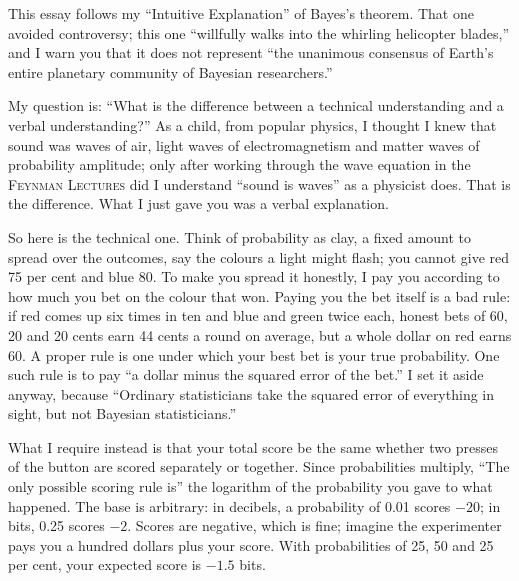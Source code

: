
This essay follows my ``Intuitive Explanation'' of Bayes's theorem. That one avoided controversy; this one ``willfully walks into the whirling helicopter blades,'' and I warn you that it does not represent ``the unanimous consensus of Earth's entire planetary community of Bayesian researchers.'' 

My question is: ``What is the difference between a technical understanding and a verbal understanding?'' As a child, from popular physics, I thought I knew that sound was waves of air, light waves of electromagnetism and matter waves of probability amplitude; only after working through the wave equation in the \textsc{Feynman Lectures} did I understand ``sound is waves'' as a physicist does. That is the difference. What I just gave you was a verbal explanation.

So here is the technical one. Think of probability as clay, a fixed amount to spread over the outcomes, say the colours a light might flash; you cannot give red 75 per cent and blue 80. To make you spread it honestly, I pay you according to how much you bet on the colour that won. Paying you the bet itself is a bad rule: if red comes up six times in ten and blue and green twice each, honest bets of 60, 20 and 20 cents earn 44 cents a round on average, but a whole dollar on red earns 60. A proper rule is one under which your best bet is your true probability. One such rule is to pay ``a dollar minus the squared error of the bet.''  I set it aside anyway, because ``Ordinary statisticians take the squared error of everything in sight, but not Bayesian statisticians.''

What I require instead is that your total score be the same whether two presses of the button are scored separately or together. Since probabilities multiply, ``The only possible scoring rule is'' the logarithm of the probability you gave to what happened. The base is arbitrary: in decibels, a probability of 0.01 scores $-20$; in bits, 0.25 scores $-2$. Scores are negative, which is fine; imagine the experimenter pays you a hundred dollars plus your score. With probabilities of 25, 50 and 25 per cent, your expected score is $-1.5$ bits. 

